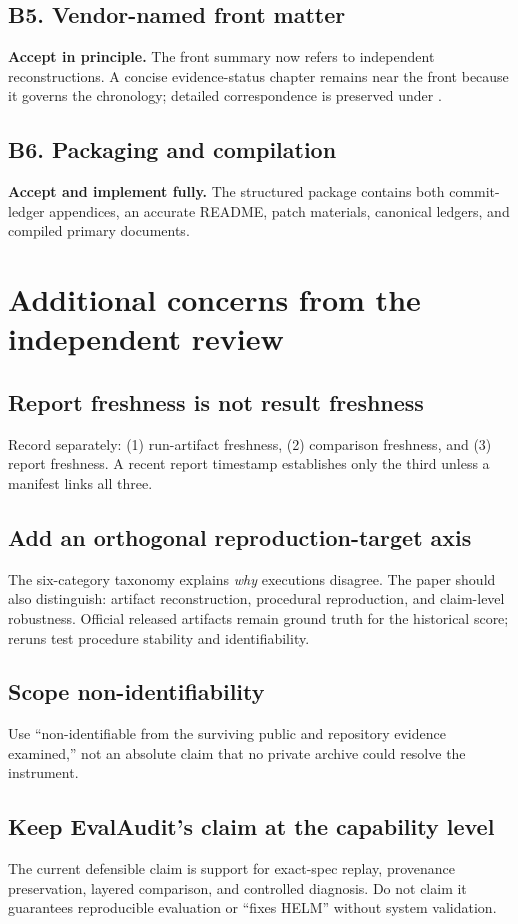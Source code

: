 \documentclass[11pt]{article}
\newcommand{\code}[1]{\texttt{\detokenize{#1}}}
\begin{document}
\subsection*{B5. Vendor-named front matter}
\textbf{Accept in principle.} The front summary now refers to independent
reconstructions. A concise evidence-status chapter remains near the front because it
governs the chronology; detailed correspondence is preserved under \code{validation/}.

\subsection*{B6. Packaging and compilation}
\textbf{Accept and implement fully.} The structured package contains both commit-ledger
appendices, an accurate README, patch materials, canonical ledgers, and compiled
primary documents.

\section{Additional concerns from the independent review}

\subsection*{Report freshness is not result freshness}
Record separately: (1) run-artifact freshness, (2) comparison freshness, and (3)
report freshness. A recent report timestamp establishes only the third unless a
manifest links all three.

\subsection*{Add an orthogonal reproduction-target axis}
The six-category taxonomy explains \emph{why} executions disagree. The paper should
also distinguish: artifact reconstruction, procedural reproduction, and claim-level
robustness. Official released artifacts remain ground truth for the historical score;
reruns test procedure stability and identifiability.

\subsection*{Scope non-identifiability}
Use ``non-identifiable from the surviving public and repository evidence examined,''
not an absolute claim that no private archive could resolve the instrument.

\subsection*{Keep EvalAudit's claim at the capability level}
The current defensible claim is support for exact-spec replay, provenance preservation,
layered comparison, and controlled diagnosis. Do not claim it guarantees reproducible
evaluation or ``fixes HELM'' without system validation.
\end{document}
